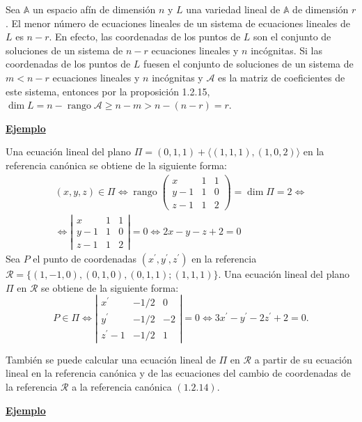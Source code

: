 \documentclass[12pt, a4paper, ones, notitlepage, openany,titlepage]{article}
\newcommand{\ejemplo}{\noindent\underline{\textbf{Ejemplo}}}
\begin{document}
Sea $\mathbb{A}$ un espacio afín de dimensión $n$ y $L$ una variedad lineal de $\mathbb{A}$ de dimensión $r$. El menor número de ecuaciones lineales de un sistema de ecuaciones lineales de $L$ es $n-r$. En efecto, las coordenadas de los puntos de $L$ son el conjunto de soluciones de un sistema de $n-r$ ecuaciones lineales y $n$ incógnitas. Si las coordenadas de los puntos de $L$ fuesen el conjunto de soluciones de un sistema de $m<n-r$ ecuaciones lineales y $n$ incógnitas y $\mathcal{A}$ es la matriz de coeficientes de este sistema, entonces por la proposición 1.2.15, $\dim  L=n-\operatorname{rango} \mathcal{A} \geq n-m>n-(n-r)=r$.

\ejemplo

Una ecuación lineal del plano $\Pi=(0,1,1)+\langle(1,1,1),(1,0,2)\rangle$ en la referencia canónica se obtiene de la siguiente forma:
\begin{gather*}
(x, y, z) \in \Pi \Longleftrightarrow \operatorname{rango}\left(\begin{array}{ccc}x & 1 & 1 \\ y-1 & 1 & 0 \\ z-1 & 1 & 2\end{array}\right)=\dim  \Pi=2 \Longleftrightarrow \\ \Longleftrightarrow \left|\begin{array}{ccc}x & 1 & 1 \\ y-1 & 1 & 0 \\ z-1 & 1 & 2\end{array}\right|=0 \Longleftrightarrow 2 x-y-z+2=0
\end{gather*}
Sea $P$ el punto de coordenadas $\left(x^{\prime}, y^{\prime}, z^{\prime}\right)$ en la referencia $\mathcal{R}=\{(1,-1,0),(0,1,0),(0,1,1) ;(1,1,1)\}$. Una ecuación lineal del plano $\Pi$ en $\mathcal{R}$ se obtiene de la siguiente forma:
$$
P \in \Pi \Longleftrightarrow\left|\begin{array}{ccr}
x^{\prime} & -1 / 2 & 0 \\
y^{\prime} & -1 / 2 & -2 \\
z^{\prime}-1 & -1 / 2 & 1
\end{array}\right|=0 \Longleftrightarrow 3 x^{\prime}-y^{\prime}-2 z^{\prime}+2=0 .
$$

También se puede calcular una ecuación lineal de $\Pi$ en $\mathcal{R}$ a partir de su ecuación lineal en la referencia canónica y de las ecuaciones del cambio de coordenadas de la referencia $\mathcal{R}$ a la referencia canónica $(1.2 .14)$.

\ejemplo
\end{document}
